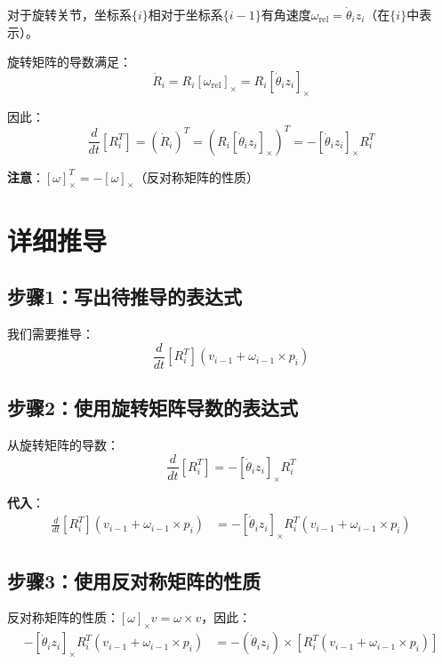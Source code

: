\documentclass[12pt,a4paper]{article}
\begin{document}
对于旋转关节，坐标系$\{i\}$相对于坐标系$\{i-1\}$有角速度$\omega_{\text{rel}} = \dot{\theta}_i z_i$（在$\{i\}$中表示）。

旋转矩阵的导数满足：
\begin{equation}
\dot{R}_i = R_i [\omega_{\text{rel}}]_{\times} = R_i [\dot{\theta}_i z_i]_{\times}
\end{equation}

因此：
\begin{equation}
\frac{d}{dt}[R_i^T] = (\dot{R}_i)^T = (R_i [\dot{\theta}_i z_i]_{\times})^T = -[\dot{\theta}_i z_i]_{\times} R_i^T
\end{equation}

\textbf{注意}：$[\omega]_{\times}^T = -[\omega]_{\times}$（反对称矩阵的性质）

\section{详细推导}

\subsection{步骤1：写出待推导的表达式}

我们需要推导：
\begin{equation}
\frac{d}{dt}[R_i^T](v_{i-1} + \omega_{i-1} \times p_i)
\end{equation}

\subsection{步骤2：使用旋转矩阵导数的表达式}

从旋转矩阵的导数：
\begin{equation}
\frac{d}{dt}[R_i^T] = -[\dot{\theta}_i z_i]_{\times} R_i^T
\end{equation}

\textbf{代入}：
\begin{align}
\frac{d}{dt}[R_i^T](v_{i-1} + \omega_{i-1} \times p_i) &= -[\dot{\theta}_i z_i]_{\times} R_i^T (v_{i-1} + \omega_{i-1} \times p_i)
\end{align}

\subsection{步骤3：使用反对称矩阵的性质}

反对称矩阵的性质：$[\omega]_{\times} v = \omega \times v$，因此：
\begin{align}
-[\dot{\theta}_i z_i]_{\times} R_i^T (v_{i-1} + \omega_{i-1} \times p_i) &= -(\dot{\theta}_i z_i) \times [R_i^T (v_{i-1} + \omega_{i-1} \times p_i)]
\end{align}
\end{document}
